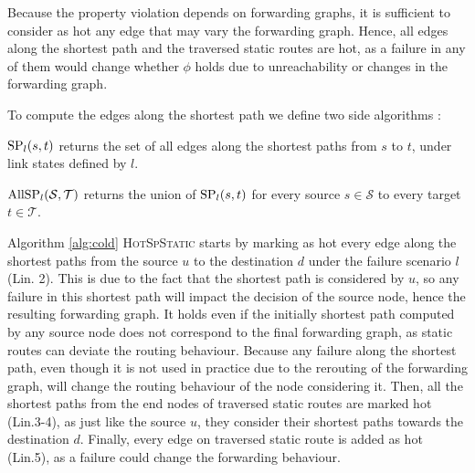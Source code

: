Because the property violation depends on forwarding graphs, it is sufficient to consider as hot any edge that may vary the forwarding graph. 
Hence, all edges along the shortest path and the traversed static routes are hot, as a failure in any of them would change whether $\phi$ holds due to unreachability or changes in the forwarding graph. 

To compute the edges along the shortest path we define two side algorithms : 
\begin{definition}$\textnormal{SP}_l(s,t)$
	returns the set of all edges along the shortest paths from $s$ to $t$, under link states defined by $l$.
\end{definition}
\begin{definition}$\textnormal{AllSP}_l({\mathcal{S}, \mathcal{T}})$
\label{def:allsp}
	returns the union of  $\textnormal{SP}_l(s,t)$ for every source $s \in \mathcal{S}$ to every target $t \in \mathcal{T}$.  
\end{definition} 


Algorithm \ref{alg:cold} \textsc{HotSpStatic} starts by marking as hot every edge along the shortest paths from the source $u$ to the destination $d$ under the failure scenario $l$ (Lin. 2).
This is due to the fact that the shortest path is considered by $u$, so any failure in this shortest path will impact the decision of the source node, hence the resulting forwarding graph.
It holds even if the initially shortest path computed by any source node does not correspond to the final forwarding graph, as static routes can deviate the routing behaviour.
Because any failure along the shortest path, even though it is not used in practice due to the rerouting of the forwarding graph, will change the routing behaviour of the node considering it. 
Then, all the shortest paths from the end nodes of traversed static routes are marked hot (Lin.3-4), as just like the source $u$, they consider their shortest paths towards the destination $d$. 
Finally, every edge on traversed static route is added as hot (Lin.5), as a failure could change the forwarding behaviour.


